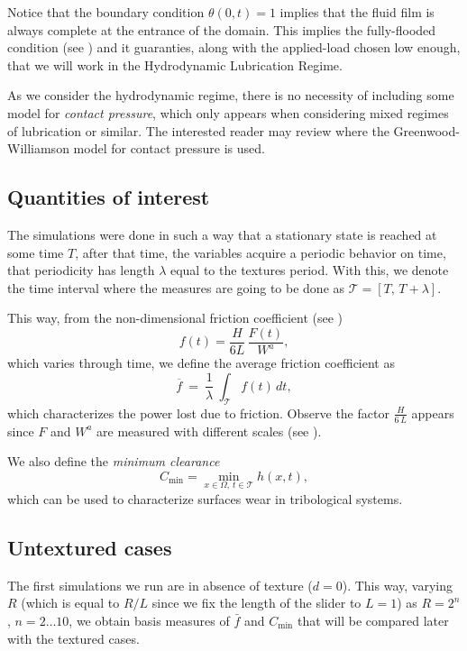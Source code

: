 Notice that the boundary condition $\theta(0,t)=1$ implies that the fluid film is always complete at the entrance of the domain. This implies the fully-flooded condition (see ) and it guaranties, along with the applied-load chosen low enough, that we will work in the Hydrodynamic Lubrication Regime.

As we consider the hydrodynamic regime, there is no necessity of including some model for \emph{contact pressure}, which only appears when considering mixed regimes of lubrication or similar. The interested reader may review \cite{tomanik2013} where the Greenwood-Williamson \cite{greenwood1970} model for contact pressure is used.

\subsection{Quantities of interest}
The simulations were done in such a way that a stationary state is reached at some time $T$, after that time, the variables acquire a periodic behavior on time, that periodicity has length $\lambda$ equal to the textures period. With this, we denote the time interval where the measures are going to be done as $\mathcal{T} = [T,\,T+\lambda]$.
 
This way, from the non-dimensional friction coefficient (see )
\begin{equation}
f(t) = \frac{H}{6L}\,\frac{F(t)}{W^{a}},
\end{equation}
which varies through time, we define the average friction coefficient as
\begin{equation}
\overline{f} ~=~\frac{1}{\lambda}~\int_\mathcal{T} f(t)\,dt,
\end{equation}
which characterizes the power lost due to friction. Observe the factor $\frac{H}{6\,L}$ appears since $F$ and $W^a$ are measured with different scales (see ).

We also define the {\em minimum clearance}
\begin{equation}
C_{\min}=\min_{x\in \Omega,\,t\in\mathcal{T} } h(x,t),
\end{equation}
which can be used to characterize surfaces wear in tribological systems.

\subsection{Untextured cases}
The first simulations we run are in absence of texture ($d=0$). This way, varying $R$ (which is equal to $R/L$ since we fix the length of the slider to $L=1$) as $R=2^n$, $n=2\ldots 10$, we obtain basis measures of $\bar{f}$ and $C_\text{min}$ that will be compared later with the textured cases.

